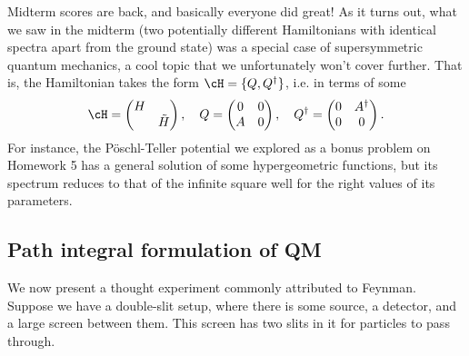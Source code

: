 Midterm scores are back, and basically everyone did great! As it turns out, what we saw in the midterm (two potentially different Hamiltonians with identical spectra apart from the ground state) was a special case of supersymmetric quantum mechanics, a cool topic that we unfortunately won't cover further. That is, the Hamiltonian takes the form $\cH = \set{Q,Q^\dagger}$, i.e. in terms of some
\begin{equation}
    \cH = \begin{pmatrix}
        H &\\
        & \tilde H
    \end{pmatrix},
    \quad Q = \begin{pmatrix}
    0 & 0\\
    A & 0
    \end{pmatrix},\quad
    Q^\dagger = \begin{pmatrix}
    0 & A^\dagger \\
    0 & 0
    \end{pmatrix}.
\end{equation}
For instance, the P\"oschl-Teller potential we explored as a bonus problem on Homework 5 has a general solution of some hypergeometric functions, but its spectrum reduces to that of the infinite square well for the right values of its parameters.

\subsection*{Path integral formulation of QM}
We now present a thought experiment commonly attributed to Feynman. Suppose we have a double-slit setup, where there is some source, a detector, and a large screen between them. This screen has two slits in it for particles to pass through.

